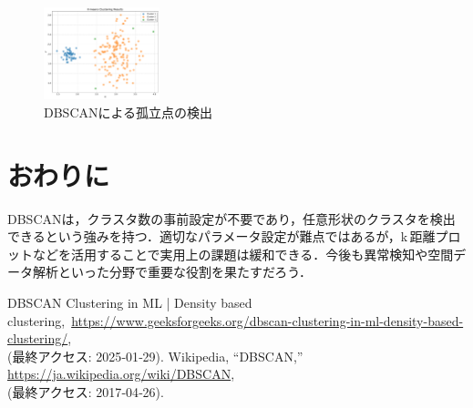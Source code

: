\documentclass[a4j]{jsarticle}
\begin{document}
\begin{figure}[htbp]
  \centering
  \includegraphics[width=0.3\textwidth]{two_island_output_plot.pdf}
  \caption{DBSCANによる孤立点の検出}
  \label{fig:dbscan_two_island}
\end{figure}





\section{おわりに}

DBSCANは，クラスタ数の事前設定が不要であり，任意形状のクラスタを検出できるという強みを持つ．適切なパラメータ設定が難点ではあるが，k\,\-距離プロットなどを活用することで実用上の課題は緩和できる．今後も異常検知や空間データ解析といった分野で重要な役割を果たすだろう．

\begin{thebibliography}{99}
   DBSCAN Clustering in ML | Density based clustering,\
        \url{https://www.geeksforgeeks.org/dbscan-clustering-in-ml-density-based-clustering/},\\
        (最終アクセス: 2025‑01‑29).
   Wikipedia, ``DBSCAN,''\\
        \url{https://ja.wikipedia.org/wiki/DBSCAN},\\
        (最終アクセス: 2017‑04‑26).
\end{thebibliography}
\end{document}
